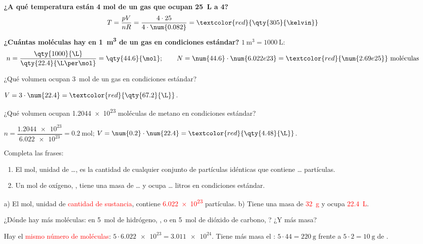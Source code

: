 \begin{example}
    \textbf{¿A qué temperatura están 4 mol de un gas que ocupan \qty{25}{\L} a \qty{4}{\atm}?}
    \[ T = \frac{p V}{n R} = \frac{4 \cdot 25}{4 \cdot \num{0.082}} = \textcolor{red}{\qty{305}{\kelvin}} \]
    \textbf{¿Cuántas moléculas hay en \qty{1}{\cubic\metre} de un gas en condiciones estándar?} \(\qty{1}{\cubic\metre} = \qty{1000}{\L}\):
    \[ n = \frac{\qty{1000}{\L}}{\qty{22.4}{\L\per\mol}} = \qty{44.6}{\mol}; \qquad N = \num{44.6} \cdot \num{6.022e23} = \textcolor{red}{\num{2.69e25}} \text{ moléculas} \]
\end{example}

\begin{exercise}
    ¿Qué volumen ocupan \qty{3}{\mol} de un gas en condiciones estándar?
    \begin{solu}
        \(V = 3 \cdot \num{22.4} = \textcolor{red}{\qty{67.2}{\L}}\).
    \end{solu}
\end{exercise}

\begin{exercise}
    ¿Qué volumen ocupan \num{1.2044e23} moléculas de metano en condiciones estándar?
    \begin{solu}
        \(n = \dfrac{\num{1.2044e23}}{\num{6.022e23}} = \qty{0.2}{\mol}\); \(V = \num{0.2} \cdot \num{22.4} = \textcolor{red}{\qty{4.48}{\L}}\).
    \end{solu}
\end{exercise}

\begin{exercise}
    Completa las frases:
    \begin{enumerate}[label=\alph*)]
        \item El mol, unidad de \ldots, es la cantidad de cualquier conjunto de partículas idénticas que contiene \ldots{} partículas.
        \item Un mol de oxígeno, , tiene una masa de \ldots{} y ocupa \ldots{} litros en condiciones estándar.
    \end{enumerate}
    \begin{solu}
        a) El mol, unidad de \textcolor{red}{cantidad de sustancia}, contiene \textcolor{red}{\num{6.022e23}} partículas. b) Tiene una masa de \textcolor{red}{\qty{32}{\gram}} y ocupa \textcolor{red}{\qty{22.4}{\L}}.
    \end{solu}
\end{exercise}

\begin{exercise}
    ¿Dónde hay más moléculas: en \qty{5}{\mol} de hidrógeno, , o en \qty{5}{\mol} de dióxido de carbono, ? ¿Y más masa?
    \begin{solu}
        Hay el \textcolor{red}{mismo número de moléculas}: \(5 \cdot \num{6.022e23} = \num{3.011e24}\). Tiene más masa el : \(5 \cdot 44 = \qty{220}{\gram}\) frente a \(5 \cdot 2 = \qty{10}{\gram}\) de .
    \end{solu}
\end{exercise}

